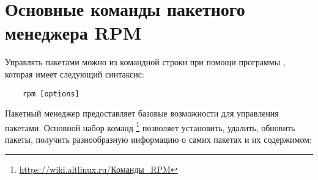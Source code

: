 \chapter{Основные команды пакетного менеджера RPM}\label{basic-package-manager-commands}
Управлять пакетами можно из командной строки при помощи программы , которая имеет следующий синтаксис:
\begin{verbatim}
    rpm [options]
\end{verbatim}

Пакетный менеджер  предоставляет базовые возможности для управления пакетами. Основной набор команд%
\footnote{\href{https://wiki.altlinux.ru/\%D0\%9A\%D0\%BE\%D0\%BC\%D0\%B0\%D0\%BD\%D0\%B4\%D1\%8B_RPM}{https://wiki.altlinux.ru/Команды\_RPM}}
позволяет установить, удалить, обновить пакеты, получить разнообразную информацию о самих пакетах и их содержимом:

